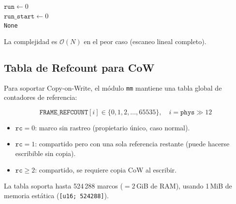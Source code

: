 \documentclass[11pt,twoside,openright]{book}
\theoremstyle{definition}
\theoremstyle{plain}
\theoremstyle{remark}
\newcommand{\bigO}{\mathcal{O}}
\begin{document}
\begin{algorithm}[H]
\caption{\textsc{Frame-Alloc-Contiguous}: Asignación de $k$ marcos contiguos}
\label{alg:frame-alloc-contig}
$\texttt{run} \leftarrow 0$ \\
$\texttt{run\_start} \leftarrow 0$ \\
\Return \texttt{None}
\end{algorithm}

La complejidad es $\bigO(N)$ en el peor caso (escaneo lineal completo).

\subsection{Tabla de Refcount para CoW}

Para soportar Copy-on-Write, el módulo \texttt{mm} mantiene una tabla global de
contadores de referencia:

\[
\texttt{FRAME\_REFCOUNT}[i] \in \{0, 1, 2, \ldots, 65535\}, \quad i = \texttt{phys} \gg 12
\]

\begin{itemize}
    \item $\texttt{rc} = 0$: marco sin rastreo (propietario único, caso normal).
    \item $\texttt{rc} = 1$: compartido pero con una sola referencia restante
          (puede hacerse escribible sin copia).
    \item $\texttt{rc} \geq 2$: compartido, se requiere copia CoW al escribir.
\end{itemize}

La tabla soporta hasta 524\,288 marcos ($= 2$\,GiB de RAM), usando 1\,MiB
de memoria estática (\texttt{[u16; 524288]}).

\end{document}

